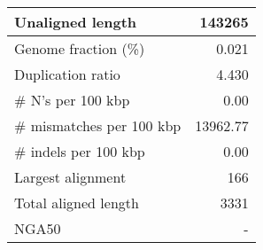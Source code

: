 \documentclass[12pt,a4paper]{article}
\begin{document}
\begin{table}[ht]
\begin{center}
\begin{tabular}{|l*{1}{|r}|}
Unaligned length & 143265 \\ \hline
Genome fraction (\%) & 0.021 \\ \hline
Duplication ratio & 4.430 \\ \hline
\# N's per 100 kbp & 0.00 \\ \hline
\# mismatches per 100 kbp & 13962.77 \\ \hline
\# indels per 100 kbp & 0.00 \\ \hline
Largest alignment & 166 \\ \hline
Total aligned length & 3331 \\ \hline
NGA50 & - \\ \hline
\end{tabular}
\end{center}
\end{table}
\end{document}
